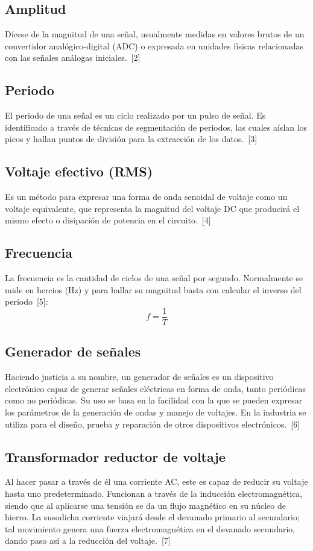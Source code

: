 \documentclass[conference]{IEEEtran} %
\begin{document}
\subsection{Amplitud}
Dícese de la magnitud de una señal, usualmente medidas en valores brutos de un convertidor analógico-digital (ADC) o expresada en unidades físicas relacionadas con las señales análogas iniciales.~[2]

\subsection{Periodo}
El periodo de una señal es un ciclo realizado por un pulso de señal. Es identificado a través de técnicas de segmentación de periodos, las cuales aíslan los picos y hallan puntos de división para la extracción de los datos.~[3]

\subsection{Voltaje efectivo (RMS)}
Es un método para expresar una forma de onda senoidal de voltaje como un voltaje equivalente, que representa la magnitud del voltaje DC que producirá el mismo efecto o disipación de potencia en el circuito.~[4]

\subsection{Frecuencia}
La frecuencia es la cantidad de ciclos de una señal por segundo. Normalmente se mide en hercios (Hz) y para hallar su magnitud basta con calcular el inverso del periodo~[5]:
\begin{equation}
    f = \frac{1}{T}
\end{equation}

\subsection{Generador de señales}
Haciendo justicia a su nombre, un generador de señales es un dispositivo electrónico capaz de generar señales eléctricas en forma de onda, tanto periódicas como no periódicas. Su uso se basa en la facilidad con la que se pueden expresar los parámetros de la generación de ondas y manejo de voltajes. En la industria se utiliza para el diseño, prueba y reparación de otros dispositivos electrónicos.~[6]

\subsection{Transformador reductor de voltaje}
Al hacer pasar a través de él una corriente AC, este es capaz de reducir su voltaje hasta uno predeterminado. Funcionan a través de la inducción electromagnética, siendo que al aplicarse una tensión se da un flujo magnético en su núcleo de hierro. La susodicha corriente viajará desde el devanado primario al secundario; tal movimiento genera una fuerza electromagnética en el devanado secundario, dando paso así a la reducción del voltaje.~[7]
\end{document}
